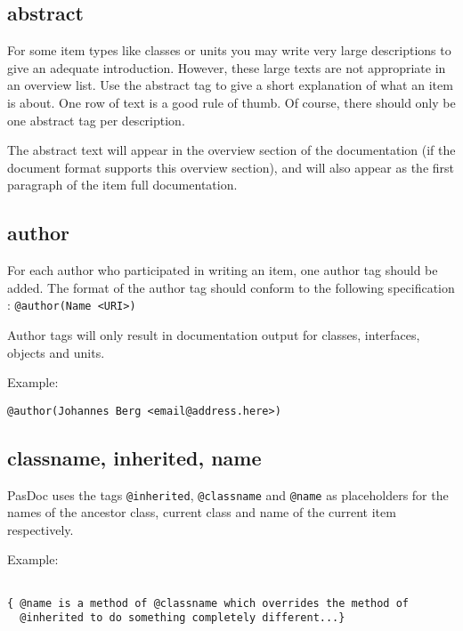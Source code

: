 \documentclass[11pt]{article}
\begin{document}
\subsection{abstract}

For some item types like classes or units you may write very large
descriptions to give an adequate introduction.
However, these large texts are not appropriate in an overview list.
Use the abstract tag to give a short explanation of what an item
is about. 
One row of text is a good rule of thumb.
Of course, there should only be one abstract tag per description.

The abstract text will appear in the overview section of the
documentation (if the document format supports this overview section), 
and will also appear as the first paragraph of the item full 
documentation.

\subsection{author}

For each author who participated in writing an item, one author tag
should be added. The format of the author tag should conform to
the following specification : {\tt @author(Name <URI>)}

Author tags will only result in documentation output for
classes, interfaces, objects and units.

Example:
\begin{verbatim}
@author(Johannes Berg <email@address.here>)
\end{verbatim}

\subsection{classname, inherited, name}

PasDoc uses the tags {\tt @inherited}, {\tt @classname} and {\tt @name} as 
placeholders for the names of the ancestor class, current class and name of the 
current item respectively.

Example:
\begin{verbatim}

{ @name is a method of @classname which overrides the method of 
  @inherited to do something completely different...}
\end{verbatim}
\end{document}
